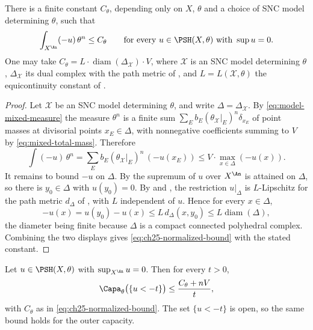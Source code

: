 \begin{lemma}
\label{lem:ch25-normalized-bound}
There is a finite constant \(C_\theta\), depending only on \(X\), \(\theta\)
and a choice of SNC model determining \(\theta\), such that
\begin{equation}
\label{eq:ch25-normalized-bound}
 \int_{X^{\An}}(-u)\,\theta^n\leq C_\theta
 \qquad\text{for every }u\in\PSH(X,\theta)\text{ with }\sup u=0 .
\end{equation}
One may take \(C_\theta=L\cdot\operatorname{diam}(\Delta_{\mathcal X})\cdot
V\), where \(\mathcal X\) is an SNC model determining \(\theta\),
\(\Delta_{\mathcal X}\) its dual complex with the path metric of
, and \(L=L(\mathcal X,\theta)\) the equicontinuity
constant of .
\end{lemma}

\begin{proof}
Let \(\mathcal X\) be an SNC model determining \(\theta\), and write
\(\Delta=\Delta_{\mathcal X}\).  By
\eqref{eq:model-mixed-measure} the measure \(\theta^n\) is a finite sum
\(\sum_Eb_E(\theta_{\mathcal X}|_E)^n\delta_{x_E}\) of point masses at
divisorial points \(x_E\in\Delta\), with nonnegative coefficients summing to
\(V\) by \eqref{eq:mixed-total-mass}.  Therefore
\[
 \int(-u)\,\theta^n=\sum_Eb_E(\theta_{\mathcal X}|_E)^n\,(-u(x_E))
 \leq V\cdot\max_{x\in\Delta}(-u(x)) .
\]
It remains to bound \(-u\) on \(\Delta\).  By
 the supremum of \(u\) over \(X^{\An}\) is
attained on \(\Delta\), so there is \(y_0\in\Delta\) with \(u(y_0)=0\).  By
 and
, the restriction \(u|_\Delta\) is
\(L\)-Lipschitz for the path metric \(d_\Delta\) of
, with \(L\) independent of \(u\).  Hence for
every \(x\in\Delta\),
\[
 -u(x)=u(y_0)-u(x)\leq L\,d_\Delta(x,y_0)
 \leq L\operatorname{diam}(\Delta),
\]
the diameter being finite because \(\Delta\) is a compact connected
polyhedral complex.  Combining the two displays gives
\eqref{eq:ch25-normalized-bound} with the stated constant.
\end{proof}

\begin{proposition}
\label{prop:ch25-sublevel-capacity}
Let \(u\in\PSH(X,\theta)\) with \(\sup_{X^{\An}}u=0\).  Then for every
\(t>0\),
\begin{equation}
\label{eq:ch25-sublevel-capacity}
 \Capa_\theta\bigl(\{u<-t\}\bigr)
 \leq\frac{C_\theta+nV}{t},
\end{equation}
with \(C_\theta\) as in \eqref{eq:ch25-normalized-bound}.  The set
\(\{u<-t\}\) is open, so the same bound holds for the outer capacity.
\end{proposition}

